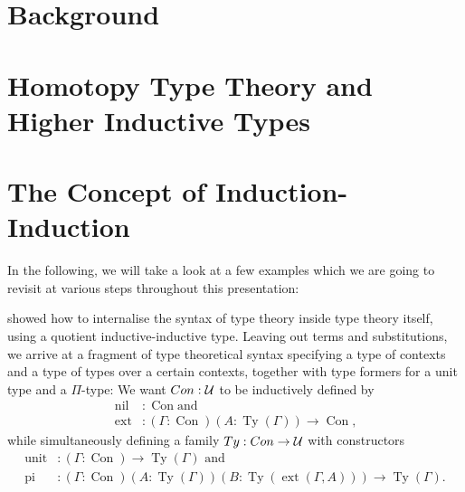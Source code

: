 \section{Background}

\section{Homotopy Type Theory and Higher Inductive Types}

\section{The Concept of Induction-Induction}

In the following, we will take a look at a few examples which we are going to
revisit at various steps throughout this presentation:

\begin{example}\label{ex:ttintt}
\cite{ttintt} showed how to internalise the syntax of type theory inside type
theory itself, using a quotient inductive-inductive type.
Leaving out terms and substitutions, we arrive at a fragment of type theoretical
syntax specifying a type of contexts and a type of types over a certain contexts,
together with type formers for a unit type and a $\Pi$-type:
We want $\mathop{Con} : \mathcal{U}$ to be inductively defined by
\begin{align*}
\mathop{nil}	&: \mathop{Con} \text{and } \\
\mathop{ext}	&: (\Gamma : \mathop{Con})(A : \mathop{Ty}(\Gamma)) \to \mathop{Con} \text{,}
\end{align*}
while simultaneously defining a family $\mathop{Ty} : \mathop{Con} \to \mathcal{U}$ with constructors
\begin{align*}
\mathop{unit}	&: (\Gamma : \mathop{Con}) \to \mathop{Ty}(\Gamma) \text{ and} \\
\mathop{pi}	&: (\Gamma : \mathop{Con})(A : \mathop{Ty}(\Gamma))(B : \mathop{Ty}(\mathop{ext}(\Gamma, A))) \to \mathop{Ty}(\Gamma) \text{.}
\end{align*}
\end{example}

